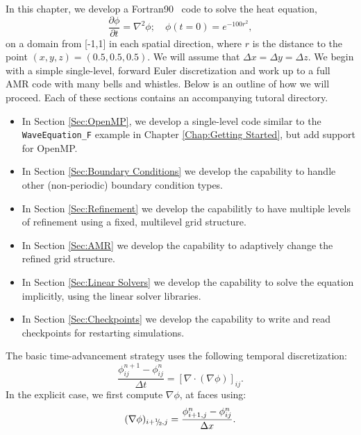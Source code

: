 In this chapter, we develop a Fortran90 \BoxLib\ code to solve the heat equation,
\begin{equation}
\frac{\partial\phi}{\partial t} = \nabla^2 \phi; \quad \phi(t=0) = e^{-100r^2},
\end{equation}
on a domain from [-1,1] in each spatial direction, where $r$ is the distance
to the point $(x,y,z) = (0.5,0.5,0.5)$.  We will
assume that $\Delta x = \Delta y = \Delta z$.  We begin with a simple single-level, 
forward Euler discretization and work up to
a full AMR code with many bells and whistles.  Below is an outline of how we will 
proceed.  Each of these sections contains an accompanying tutoral directory.
\begin{itemize}

\item In Section \ref{Sec:OpenMP}, we develop a single-level code similar to the
{\tt WaveEquation\_F} example in Chapter \ref{Chap:Getting Started}, but add 
support for OpenMP.

\item In Section \ref{Sec:Boundary Conditions} we develop the capability to handle
other (non-periodic) boundary condition types.

\item In Section \ref{Sec:Refinement} we develop the capabilitly to have multiple
levels of refinement using a fixed, multilevel grid structure.

\item In Section \ref{Sec:AMR} we develop the capability to adaptively change the
refined grid structure.

\item In Section \ref{Sec:Linear Solvers} we develop the capability to solve the
equation implicitly, using the linear solver libraries.

\item In Section \ref{Sec:Checkpoints} we develop the capability to write and read
checkpoints for restarting simulations.

\end{itemize}
The basic time-advancement strategy uses the following temporal discretization:
\begin{equation}
\frac{\phi_{ij}^{n+1} - \phi_{ij}^n}{\Delta t} = \left[\nabla\cdot(\nabla\phi)\right]_{ij}.
\end{equation}
In the explicit case, we first compute $\nabla\phi$, at faces using:
\begin{equation}
(\nabla\phi)_{i+\myhalf,j} = \frac{\phi_{i+1,j}^n-\phi_{ij}^n}{\Delta x}.
\end{equation}
